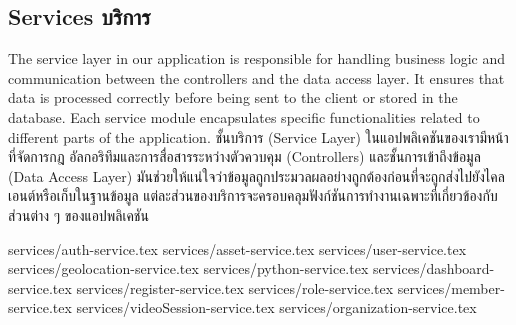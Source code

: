 \subsection{\ifenglish Services \else บริการ \fi}

\ifenglish
The service layer in our application is responsible for handling business logic and communication between the controllers and the data access layer. It ensures that data is processed correctly before being sent to the client or stored in the database. Each service module encapsulates specific functionalities related to different parts of the application.
\else
ชั้นบริการ (Service Layer) ในแอปพลิเคชันของเรามีหน้าที่จัดการกฎ อัลกอริทึมและการสื่อสารระหว่างตัวควบคุม (Controllers) และชั้นการเข้าถึงข้อมูล (Data Access Layer) มันช่วยให้แน่ใจว่าข้อมูลถูกประมวลผลอย่างถูกต้องก่อนที่จะถูกส่งไปยังไคลเอนต์หรือเก็บในฐานข้อมูล แต่ละส่วนของบริการจะครอบคลุมฟังก์ชันการทำงานเฉพาะที่เกี่ยวข้องกับส่วนต่าง ๆ ของแอปพลิเคชัน
\fi


{services/auth-service.tex}
{services/asset-service.tex}
{services/user-service.tex}
{services/geolocation-service.tex}
{services/python-service.tex}
{services/dashboard-service.tex}
{services/register-service.tex}
{services/role-service.tex}
{services/member-service.tex}
{services/videoSession-service.tex}
{services/organization-service.tex}
